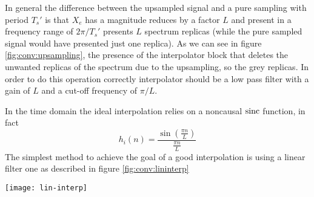 	In general the difference between the upsampled signal and a pure sampling with period $T_s'$ is that $X_e$ has a magnitude reduces by a factor $L$ and present in a frequency range of $2\pi/T_s'$ presents $L$ spectrum replicas (while the pure sampled signal would have presented just one replica). As we can see in figure \ref{fig:conv:upsampling}, the presence of the interpolator block that deletes the unwanted replicas of the spectrum due to the upsampling, so the grey replicas. In order to do this operation correctly interpolator should be a low pass filter with a gain of $L$ and a cut-off frequency of $\pi/L$.
	
	In the time domain the ideal interpolation relies on a noncausal $\textrm{sinc}$ function, in fact
	\[ h_i(n) = \frac{\sin\left( \frac{\pi n}{L}\right)}{\frac{\pi n}{L}} \]
	The simplest method to achieve the goal of a good interpolation is using a linear filter one as described in figure \ref{fig:conv:lininterp}
	
	\begin{SCfigure}[2][bht]
		\centering \texttt{[image: lin-interp]}
		\caption{time response of a linear interpolator.} \label{fig:conv:lininterp}
	\end{SCfigure}
	
	
	
	
	
	
	
	
	
	
	
	
	
	
	
	
	
	
	
	
	
	
		
		
	
	
	
	